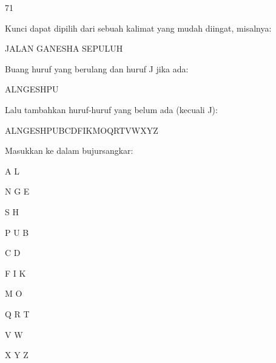 \documentclass{article}
\begin{document}

71

Kunci dapat dipilih dari sebuah kalimat yang mudah diingat, misalnya: 


JALAN GANESHA SEPULUH 


Buang huruf yang berulang dan huruf J jika ada: 


ALNGESHPU 


Lalu tambahkan huruf-huruf yang belum ada (kecuali J): 


ALNGESHPUBCDFIKMOQRTVWXYZ 


Masukkan ke dalam bujursangkar: 


A L 

N G E 

S H 

P U B 

C D 

F I K 

M O 

Q R T 

V W 

X Y Z
\end{document}
